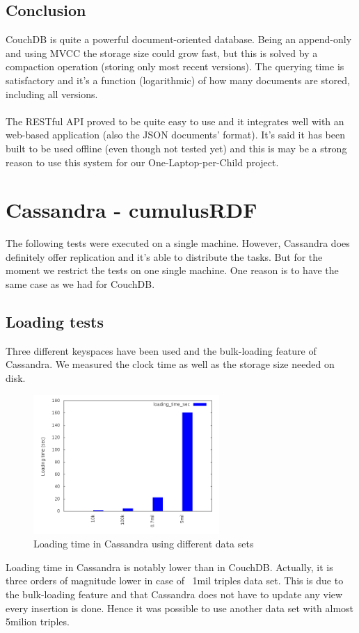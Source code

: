 \documentclass[a4paper,10pt]{article}
\begin{document}
\subsection{Conclusion}
CouchDB is quite a powerful document-oriented database. Being an append-only and using MVCC the storage size could grow fast, but this 
is solved by a compaction operation (storing only most recent versions). The querying time is satisfactory and it's a function (logarithmic) 
of how many documents are stored, including all versions. 
\paragraph{}
The RESTful API proved to be quite easy to use and it integrates well with an web-based application (also the JSON documents' format). 
It's said it has been built to be used offline (even though not tested yet) and this is may be a strong reason to use this system for 
our One-Laptop-per-Child project. 

\section{Cassandra - cumulusRDF}
The following tests were executed on a single machine. However, Cassandra does definitely offer replication and it's able to distribute the tasks.
But for the moment we restrict the tests on one single machine. One reason is to have the same case as we had for CouchDB.

\subsection{Loading tests}
Three different keyspaces have been used and the bulk-loading feature of Cassandra. We measured the clock time as well as the storage size
needed on disk. 
\begin{figure}[h!]
  \centering
  \includegraphics[height=200px]{../cassandra/plots/loading_time.png}
  \caption{Loading time in Cassandra using different data sets}
\end{figure}
Loading time in Cassandra is notably lower than in CouchDB. Actually, it is three orders of magnitude lower in case of ~1mil triples data set. 
This is due to the bulk-loading feature and that Cassandra does not have to update any view every insertion is done. 
Hence it was possible to use another data set with almost 5milion triples.
\end{document}
